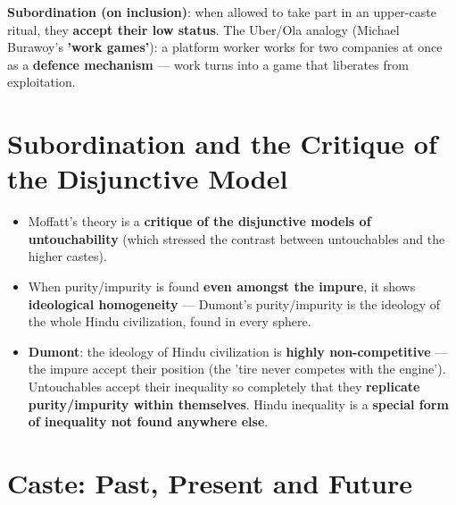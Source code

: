 \begin{KeyConcept}
\textbf{Subordination (on inclusion)}: when allowed to take part in an upper-caste ritual, they \textbf{accept their low status}. The Uber/Ola analogy (Michael Burawoy's \textbf{'work games'}): a platform worker works for two companies at once as a \textbf{defence mechanism} --- work turns into a game that liberates from exploitation.
\end{KeyConcept}

\section{Subordination and the Critique of the Disjunctive Model}

\begin{KeyConcept}
\begin{itemize}
\item Moffatt's theory is a \textbf{critique of the disjunctive models of untouchability} (which stressed the contrast between untouchables and the higher castes).
\item When purity/impurity is found \textbf{even amongst the impure}, it shows \textbf{ideological homogeneity} --- Dumont's purity/impurity is the ideology of the whole Hindu civilization, found in every sphere.
\item \textbf{Dumont}: the ideology of Hindu civilization is \textbf{highly non-competitive} --- the impure accept their position (the 'tire never competes with the engine'). Untouchables accept their inequality so completely that they \textbf{replicate purity/impurity within themselves}. Hindu inequality is a \textbf{special form of inequality not found anywhere else}.
\end{itemize}
\end{KeyConcept}

\section{Caste: Past, Present and Future}

